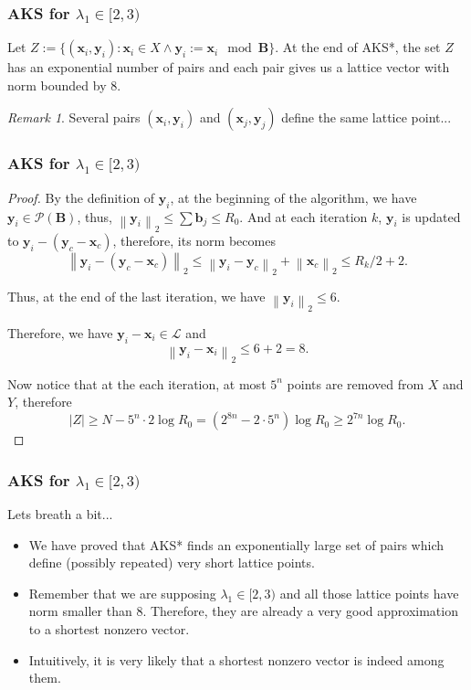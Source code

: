 \documentclass[aspectratio=43]{beamer}
\newcommand{\norm}[1]{\left\lVert #1 \right\rVert_2}
\let\vec\mathbf %
\theoremstyle{remark}
\newtheorem*{remark}{Remark}
\begin{document}
\begin{frame}
\frametitle{AKS for $\lambda_1 \in [2, 3)$}

\begin{lemma}
Let $Z := \{(\vec{x}_i, \vec{y}_i) : \vec{x}_i \in X \land \vec{y}_i := 
\vec{x}_i \mod \vec B \}$.
At the end of {\sc AKS*}, the set $Z$ has an exponential number of pairs 
and each pair gives us a lattice vector with norm bounded by $8$.
\end{lemma}

\begin{remark}
Several pairs $(\vec{x}_i, \vec{y}_i)$ and $(\vec{x}_j, \vec{y}_j)$ define the 
same lattice point...
\end{remark}

\end{frame}


\begin{frame}
\frametitle{AKS for $\lambda_1 \in [2, 3)$}

\begin{proof}
	
	By the definition of $\vec{y}_i$, at the beginning of the algorithm, we 
	have $\vec{y}_i \in \mathcal{P}(\vec B)$, thus, $\norm{\vec{y}_i} \le 
	\sum\vec{b}_j \le R_0$. And at each iteration $k$, $\vec{y}_i$ is updated 
	to $\vec{y}_i - (\vec{y}_c - \vec{x}_c)$, therefore, its norm becomes
	$$\norm{\vec{y}_i - (\vec{y}_c - \vec{x}_c)} \le \norm{\vec{y}_i - 
		\vec{y}_c} + \norm{ \vec{x}_c} \le R_k/2 + 2.$$
	
	Thus, at the end of the last iteration, we have $\norm{\vec{y}_i} \le 6$.
	
	Therefore, we have $\vec{y}_i - \vec{x}_i \in \mathcal{L}$ and 
	$$\norm{\vec{y}_i - \vec{x}_i} \le 6 + 2 = 8.$$
	
	Now notice that at the each iteration, at most $5^n$ points are removed 
	from $X$ and $Y$, therefore 
	$$|Z| \ge N - 5^n\cdot 2\log R_0 = (2^{8n} - 2\cdot 
	5^n)\log R_0 \ge 2^{7n}\log R_0.$$
\end{proof}

\end{frame}


\begin{frame}
\frametitle{AKS for $\lambda_1 \in [2, 3)$}

Lets breath a bit...
\begin{itemize}
\item We have proved that {\sc AKS*} finds an exponentially large 
set of pairs which define (possibly repeated) very short lattice points.

\item Remember that we are supposing $\lambda_1 \in [2, 3)$ and all those 
lattice points have norm smaller than $8$. Therefore, they are already a very 
good approximation to a shortest nonzero vector.

\item Intuitively, it is very likely that a shortest 
nonzero vector is indeed among them.
\end{itemize}
\end{frame}
\end{document}
